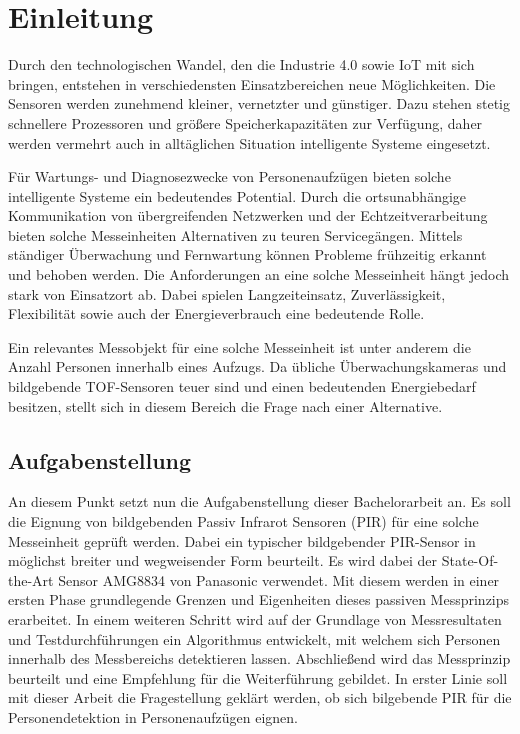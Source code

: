 \chapter{Einleitung}
\label{chap:Einleitung}


\label{sec:Ausgangssituation}
Durch den technologischen Wandel, den die Industrie 4.0 sowie \ac{IoT}  mit sich bringen, entstehen in verschiedensten Einsatzbereichen neue Möglichkeiten. Die Sensoren werden zunehmend kleiner, vernetzter und günstiger. Dazu stehen stetig schnellere Prozessoren und größere Speicherkapazitäten zur Verfügung, daher werden vermehrt auch in alltäglichen Situation intelligente Systeme eingesetzt. 

Für Wartungs- und Diagnosezwecke von Personenaufzügen bieten solche intelligente Systeme ein bedeutendes Potential. Durch die ortsunabhängige Kommunikation von übergreifenden Netzwerken und der Echtzeitverarbeitung bieten solche Messeinheiten Alternativen zu teuren Servicegängen. Mittels ständiger Überwachung und Fernwartung können Probleme frühzeitig erkannt und behoben werden. Die Anforderungen an eine solche Messeinheit hängt jedoch stark von Einsatzort ab. Dabei spielen Langzeiteinsatz, Zuverlässigkeit, Flexibilität sowie auch der Energieverbrauch eine bedeutende Rolle.

Ein relevantes Messobjekt für eine solche Messeinheit ist unter anderem die Anzahl Personen innerhalb eines Aufzugs. Da übliche Überwachungskameras und bildgebende TOF-Sensoren teuer sind und einen bedeutenden Energiebedarf besitzen, stellt sich in diesem Bereich die Frage nach einer Alternative.

\section{Aufgabenstellung}
\label{chap:Aufgabenstellung}

An diesem Punkt setzt nun die Aufgabenstellung dieser Bachelorarbeit an. Es soll die Eignung von bildgebenden Passiv Infrarot Sensoren (PIR) für eine solche Messeinheit geprüft werden. Dabei ein typischer bildgebender PIR-Sensor in möglichst breiter und wegweisender Form beurteilt. Es wird dabei der State-Of-the-Art Sensor AMG8834 von Panasonic verwendet. Mit diesem werden in einer ersten Phase grundlegende Grenzen und Eigenheiten dieses passiven Messprinzips erarbeitet. In einem weiteren Schritt wird auf der Grundlage von Messresultaten und Testdurchführungen ein Algorithmus entwickelt, mit welchem sich Personen innerhalb des Messbereichs detektieren lassen. Abschließend wird das Messprinzip beurteilt und eine Empfehlung für die Weiterführung gebildet. In erster Linie soll mit dieser Arbeit die Fragestellung geklärt werden, ob sich bilgebende \ac{PIR} für die Personendetektion in Personenaufzügen eignen.

